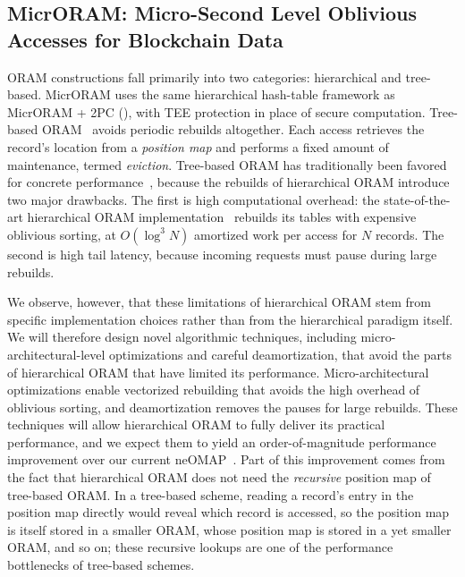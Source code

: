 \subsection{MicrORAM: Micro-Second Level Oblivious Accesses for Blockchain Data}
\label{sec:microram}


ORAM constructions fall primarily into two categories: hierarchical and
tree-based. MicrORAM uses the same hierarchical hash-table framework as
MicrORAM + 2PC (), with TEE protection in place of secure
computation. Tree-based ORAM~\cite{pathoramjrnl}
avoids periodic rebuilds altogether. Each access retrieves the record's
location from a \emph{position map} and performs a fixed amount of
maintenance, termed \emph{eviction}. Tree-based ORAM has traditionally been
favored for concrete performance~\cite{neomap}, 
because the rebuilds of hierarchical ORAM
introduce two major drawbacks. The first is high computational overhead:
the state-of-the-art hierarchical ORAM implementation~\cite{h2o2} 
rebuilds its tables with expensive
oblivious sorting, at $O(\log^3 N)$ amortized work per access for $N$
records. The second is high tail latency, because incoming requests must
pause during large rebuilds. 

We observe, however, that these limitations
of hierarchical ORAM 
stem from specific implementation choices rather than from the
hierarchical paradigm itself. We will therefore design novel algorithmic
techniques, including micro-architectural-level optimizations and careful
deamortization, that avoid the parts of hierarchical ORAM that have
limited its performance. Micro-architectural optimizations enable
vectorized rebuilding that  
avoids the high overhead of oblivious sorting, 
and deamortization removes
the pauses for large rebuilds. These techniques will allow hierarchical
ORAM to fully deliver its practical performance, and we expect them to
yield an order-of-magnitude performance improvement over our current
neOMAP~\cite{neomap}. Part of this improvement comes from the fact that
hierarchical ORAM does not need the \emph{recursive} position map of
tree-based ORAM. In a tree-based scheme, reading a record's entry in the
position map directly would reveal which record is accessed, so the
position map is itself stored in a smaller ORAM, whose position map is
stored in a yet smaller ORAM, and so on; these recursive lookups are one
of the performance bottlenecks of tree-based schemes.

